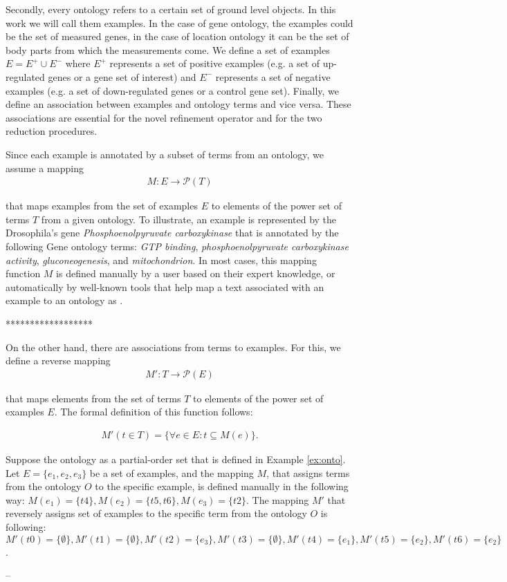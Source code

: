 
Secondly, every ontology refers to a certain set of ground level objects. In this work we will call them examples. In the case of gene ontology, the examples could be the set of measured genes, in the case of location ontology it can be the set of body parts from which the measurements come. We define a set of examples $E = E^{+} \cup E^{-}$ where $E^{+}$ represents a set of positive examples (e.g. a set of up-regulated genes or a gene set of interest) and $E^{-}$ represents a set of negative examples (e.g. a set of down-regulated genes or a control gene set). 
Finally, we define an association between examples and ontology terms and vice versa. These associations are essential for the novel refinement operator and for the two reduction procedures. 


Since each example is annotated by a subset of terms from an ontology, we assume a mapping
\begin{eqnarray}
\label{eq:mapM}
	 M :  E \rightarrow \mathcal{P}(T)
\end{eqnarray}

that maps examples from the set of examples $E$ to elements of the power set of terms $T$ from a given ontology. To illustrate, an example is represented by the Drosophila's gene \emph{Phosphoenolpyruvate carboxykinase} that is annotated by the following Gene ontology terms: \emph{GTP binding}, \emph{phosphoenolpyruvate carboxykinase activity}, \emph{gluconeogenesis}, and \emph{mitochondrion}. In most cases, this mapping function $M$ is defined manually by a user based on their expert knowledge, or automatically by well-known tools that help map a text associated with an example to an ontology as \cite{zooma}.

******************


On the other hand, there are associations from terms to examples. For this, we define a reverse mapping
\begin{eqnarray}
\label{eq:mapMr}
M' : T \rightarrow \mathcal{P}(E)
\end{eqnarray}

that maps elements from the set of terms $T$ to elements of the power set of examples $E$. The formal definition of this function follows: 

\begin{eqnarray}
\label{eq:mapMline}
M' (t \in T) = \{\forall e \in E : t \subseteq M(e)\}.
\end{eqnarray}

\begin{example} \label{ex:2}
	Suppose the ontology as a partial-order set that is defined in Example \ref{ex:onto}. Let $E = \{e_1, e_2, e_3\}$ be a set of examples, and the mapping $M$, that assigns terms from the ontology $O$ to the specific example, is defined manually in the following way: $M(e_1) = \{t4\}, M(e_2) = \{t5, t6\}, M(e_3) = \{t2\}$.
	The mapping $M'$ that reversely assigns set of examples to the specific term from the ontology $O$ is following: $M'(t0) = \{\emptyset\}, M'(t1) = \{\emptyset\}, M'(t2) = \{e_3\}, M'(t3) = \{\emptyset\}, M'(t4) = \{e_1\}, M'(t5) = \{e_2\}, M'(t6) = \{e_2\}$.
\end{example}
--

